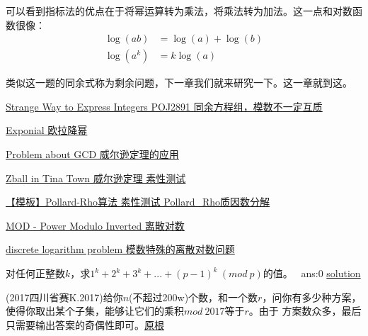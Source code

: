 可以看到指标法的优点在于将{\heiti 幂运算转为乘法，将乘法转为加法}。这一点和对数函数很像：
$$
\begin{aligned} \log (a b) &=\log (a)+\log (b) \\ \log \left(a^{k}\right) &=k \log (a) \end{aligned}
$$

类似这一题的同余式称为剩余问题，下一章我们就来研究一下。这一章就到这。


\vbox{}

\vbox{}

\begin{problemset}
	\item \href{http://poj.org/problem?id=2891}{Strange Way to Express Integers \quad POJ2891 \quad 同余方程组，模数不一定互质}  
	\item \href{https://cn.vjudge.net/problem/Gym-101550E#}{Exponial \quad 欧拉降幂}
	\item \href{http://acm.hdu.edu.cn/showproblem.php?pid=4910}{Problem about GCD \quad 威尔逊定理的应用}
	\item \href{https://vjudge.net/problem/HDU-5391}{Zball in Tina Town \quad 威尔逊定理 \quad 素性测试}
	\item \href{https://www.luogu.org/problem/P4718}{【模板】Pollard-Rho算法 \quad 素性测试 \quad Pollard\_Rho质因数分解 \label{prob:pollard}}
	\item \href{https://www.spoj.com/problems/MOD/}{MOD - Power Modulo Inverted \quad 离散对数}
	\item \href{http://acm.hdu.edu.cn/showproblem.php?pid=6632}{discrete logarithm problem \quad 模数特殊的离散对数问题}
	\item 对任何正整数$k$，求$1^k+2^k+3^k+...+(p-1)^k\ (mod\ p)$的值。 \  ans:0 \href{https://math.stackexchange.com/questions/1049420/for-any-positive-number-k-find-the-value-of-1k-2k-3k-p-1kmod?r=SearchResults#}{solution}
	\item (2017四川省赛K.2017)给你$n$(不超过200w)个数，和一个数$r$，问你有多少种方案，使得你取出某个子集，能够让它们的乘积$mod \ 2017$等于$r$。由于
	方案数众多，最后只需要输出答案的奇偶性即可。\href{https://www.cnblogs.com/autsky-jadek/p/7496328.html}{\quad 原根}
\end{problemset}

